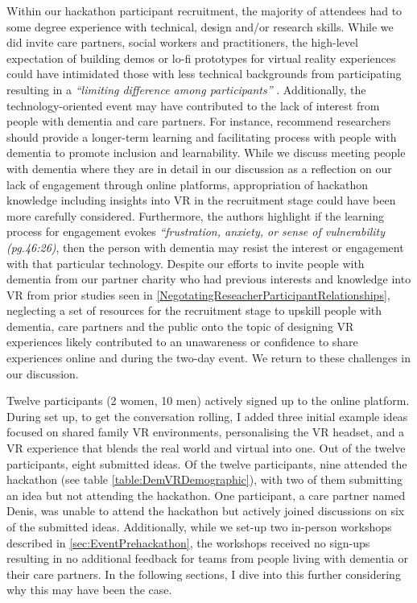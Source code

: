 Within our hackathon participant recruitment, the majority of attendees had to some degree experience with technical, design and/or research skills. While we did invite care partners, social workers and practitioners, the high-level expectation of building demos or lo-fi prototypes for virtual reality experiences could have intimidated those with less technical backgrounds from participating resulting in a \textit{“limiting difference among participants” }\citep{irani_hackathons_2015}. Additionally, the technology-oriented event may have contributed to the lack of interest from people with dementia and care partners. For instance, \cite{hwang2020exploring} recommend researchers should provide a longer-term learning and facilitating process with people with dementia to promote inclusion and learnability. While we discuss meeting people with dementia where they are in detail in our discussion as a reflection on our lack of engagement through online platforms, appropriation of hackathon knowledge including insights into VR in the recruitment stage could have been more carefully considered. Furthermore, the authors highlight if the learning process for engagement evokes \textit{“frustration, anxiety, or sense of vulnerability (pg.46:26)\citep{hwang2020exploring}}, then the person with dementia may resist the interest or engagement with that particular technology. Despite our efforts to invite people with dementia from our partner charity who had previous interests and knowledge into VR from prior studies seen in \ref{NegotatingReseacherParticipantRelationships}, neglecting a set of resources for the recruitment stage to upskill people with dementia, care partners and the public onto the topic of designing VR experiences likely contributed to an unawareness or confidence to share experiences online and during the two-day event. We return to these challenges in our discussion.

Twelve participants (2 women, 10 men) actively signed up to the online platform. During set up, to get the conversation rolling, I added three initial example ideas focused on shared family VR environments, personalising the VR headset, and a VR experience that blends the real world and virtual into one. Out of the twelve participants, eight submitted ideas. Of the twelve participants, nine attended the hackathon (see table \ref{table:DemVRDemographic}), with two of them submitting an idea but not attending the hackathon. One participant, a care partner named Denis, was unable to attend the hackathon but actively joined discussions on six of the submitted ideas. Additionally, while we set-up two in-person workshops described in \ref{sec:EventPrehackathon}, the workshops received no sign-ups resulting in no additional feedback for teams from people living with dementia or their care partners. In the following sections, I dive into this further considering why this may have been the case. 

